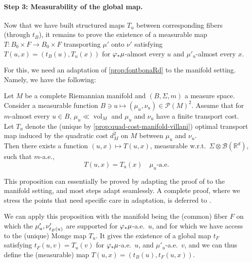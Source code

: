 \paragraph{Step 3: Measurability of the global map.} Now that we have built structured maps $T_u$ between corresponding fibers (through $t_B$), it remains to prove the existence of a measurable map $T : B_0 \times F \to B_0 \times F$ transporting $\mu'$ onto $\nu'$ satisfying $T(u,x) = (t_B(u),T_u(x))$ for $\varphi_*\mu$-almost every $u$ and $\mu'_u$-almost every $x$.

For this, we need an adaptation of \cref{prop:fontbonaRd} to the manifold setting.
Namely, we have the following:

\begin{proposition}\label{prop:selection-manifold}
    Let $M$ be a complete Riemannian manifold and $(B, \Sigma, m)$ a measure space.
    Consider a measurable function $B\ni u \mapsto (\mu_u, \nu_u) \in \mathcal{P}(M)^2$. Assume that for $m$-almost every $u\in B$, $\mu_u\ll\operatorname{vol}_M$ and $\mu_u$ and $\nu_u$ have a finite transport cost. Let $T_u$ denote the (unique by \cref{prop:quad-cost-manifold-villani}) optimal transport map induced by the quadratic cost $d_M^2$ on $M$ between $\mu_u$ and $\nu_u$.\\
    Then there exists a function $(u,x)\mapsto T(u,x)$, measurable w.r.t.~$\Sigma \otimes \mathcal{B}(\mathbb{R}^d)$, such that $m$-a.e., $$T(u,x)=T_{u}(x)\quad \mu_{u}\text{-a.e.}$$
\end{proposition}

This proposition can essentially be proved by adapting the proof of \cite{fontbona2010measurability} to the manifold setting, and most steps adapt seamlessly.
A complete proof, where we stress the points that need specific care in adaptation, is deferred to .

We can apply this proposition with the manifold being the (common) fiber $F$ on which the $\mu'_u,\smash{\nu'_{t_B(u)}}$ are supported for $\varphi_*\mu$-a.e.~$u$, and for which we have access to the (unique) Monge map $T_u$.
It gives the existence of a global map $t_F$ satisfying $t_F(u,v) = T_u(v)$ for $\varphi_*\mu$-a.e.~$u$, and $\mu'_u$-a.e.~$v$, and we can thus define the (measurable) map $T(u,x) = (t_B(u), t_F(u,x))$.

